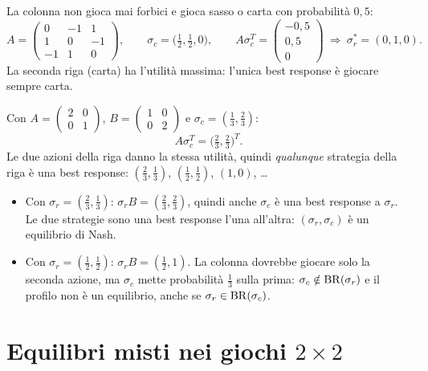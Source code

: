 \begin{esempio}
La colonna non gioca mai forbici e gioca sasso o carta con probabilità $0{,}5$:
\[
  A = \begin{pmatrix} 0 & -1 & 1 \\ 1 & 0 & -1 \\ -1 & 1 & 0 \end{pmatrix},
  \qquad \sigma_c = \bigl(\tfrac12, \tfrac12, 0\bigr),
  \qquad A\sigma_c^T = \begin{pmatrix} -0{,}5 \\ 0{,}5 \\ 0 \end{pmatrix}
  \ \Longrightarrow\ \sigma_r^* = (0, 1, 0).
\]
La seconda riga (carta) ha l'utilità massima: l'unica best response è giocare sempre carta.
\end{esempio}

\begin{esempio}
Con $A = \begin{pmatrix}2&0\\0&1\end{pmatrix}$, $B = \begin{pmatrix}1&0\\0&2\end{pmatrix}$
e $\sigma_c = (\tfrac13, \tfrac23)$:
\[
  A\sigma_c^T = \bigl(\tfrac23, \tfrac23\bigr)^T .
\]
Le due azioni della riga danno la stessa utilità, quindi \emph{qualunque} strategia della
riga è una best response: $(\tfrac23,\tfrac13)$, $(\tfrac12,\tfrac12)$, $(1,0)$, \ldots
\begin{itemize}
  \item Con $\sigma_r = (\tfrac23, \tfrac13)$: $\sigma_r B = (\tfrac23, \tfrac23)$, quindi anche
        $\sigma_c$ è una best response a $\sigma_r$. Le due strategie sono una best response
        l'una all'altra: $(\sigma_r, \sigma_c)$ è un equilibrio di Nash.
  \item Con $\sigma_r = (\tfrac12, \tfrac12)$: $\sigma_r B = (\tfrac12, 1)$. La colonna
        dovrebbe giocare solo la seconda azione, ma $\sigma_c$ mette probabilità $\tfrac13$
        sulla prima: $\sigma_c \notin \mathrm{BR}(\sigma_r)$ e il profilo non è un equilibrio,
        anche se $\sigma_r \in \mathrm{BR}(\sigma_c)$.
\end{itemize}
\end{esempio}

\section{Equilibri misti nei giochi \texorpdfstring{$2\times2$}{2x2}}

